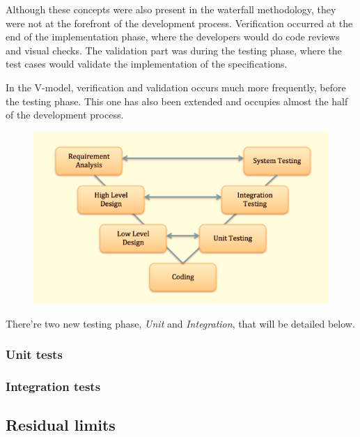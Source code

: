 Although these concepts were also present in the waterfall methodology, they
were not at the forefront of the development process.
Verification occurred at the end of the implementation phase, where the
developers would do code reviews and visual checks.
The validation part was during the testing phase, where the test cases
would validate the implementation of the specifications.

In the V-model, verification and validation occurs much more frequently,
before the testing phase.
This one has also been extended and occupies almost the half of the
development process.

\begin{figure}
    \includegraphics[width=\textwidth]{../../images/waterfall/v_model.png}
\end{figure}

There're two new testing phase, \textit{Unit} and \textit{Integration}, that
will be detailed below.

\subsubsection{Unit tests}

\subsubsection{Integration tests}

\subsection{Residual limits}\label{subsec:residual-limits}
